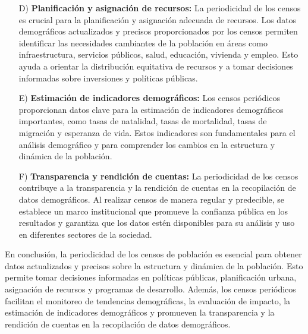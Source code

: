 \documentclass[8pt,a4paper]{beamer}
\begin{document}
{\begin{frame}
\begin{block}{}
\begin{enumerate}
\item[D)] \textbf{Planificación y asignación de recursos:} La periodicidad de los censos es crucial para la planificación y asignación adecuada de recursos. Los datos demográficos actualizados y precisos proporcionados por los censos permiten identificar las necesidades cambiantes de la población en áreas como infraestructura, servicios públicos, salud, educación, vivienda y empleo. Esto ayuda a orientar la distribución equitativa de recursos y a tomar decisiones informadas sobre inversiones y políticas públicas.
\end{enumerate}
\end{block}
\end{frame}

\begin{frame}
\begin{block}{}
\justifying
\begin{enumerate}
\justifying
\item[E)] \textbf{Estimación de indicadores demográficos:} Los censos periódicos proporcionan datos clave para la estimación de indicadores demográficos importantes, como tasas de natalidad, tasas de mortalidad, tasas de migración y esperanza de vida. Estos indicadores son fundamentales para el análisis demográfico y para comprender los cambios en la estructura y dinámica de la población.

\item[F)] \textbf{Transparencia y rendición de cuentas:} La periodicidad de los censos contribuye a la transparencia y la rendición de cuentas en la recopilación de datos demográficos. Al realizar censos de manera regular y predecible, se establece un marco institucional que promueve la confianza pública en los resultados y garantiza que los datos estén disponibles para su análisis y uso en diferentes sectores de la sociedad.
\end{enumerate}
En conclusión, la periodicidad de los censos de población es esencial para obtener datos actualizados y precisos sobre la estructura y dinámica de la población. Esto permite tomar decisiones informadas en políticas públicas, planificación urbana, asignación de recursos y programas de desarrollo. Además, los censos periódicos facilitan el monitoreo de tendencias demográficas, la evaluación de impacto, la estimación de indicadores demográficos y promueven la transparencia y la rendición de cuentas en la recopilación de datos demográficos.
\end{block}
\end{frame}

}
\end{document}
